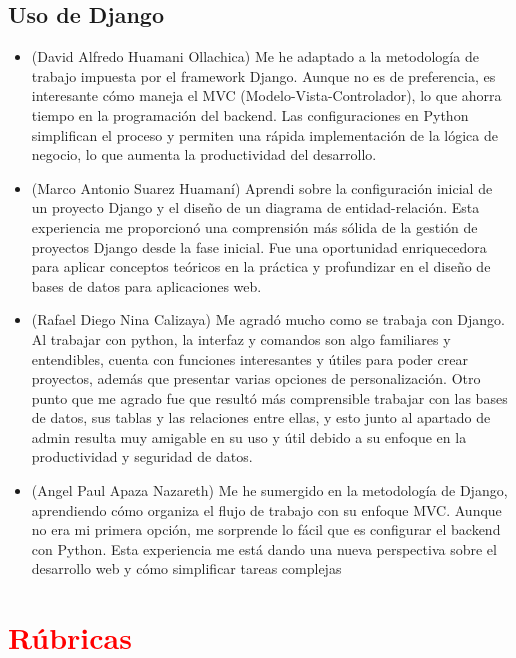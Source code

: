 \documentclass{article}
\begin{document}
\subsection{Uso de Django}
\begin{itemize}
    \item (David Alfredo Huamani Ollachica) Me he adaptado a la metodología de trabajo impuesta por el framework Django. Aunque no es de preferencia, es interesante cómo maneja el MVC (Modelo-Vista-Controlador), lo que ahorra tiempo en la programación del backend. Las configuraciones en Python simplifican el proceso y permiten una rápida implementación de la lógica de negocio, lo que aumenta la productividad del desarrollo.
    \item (Marco Antonio Suarez Huamaní)  Aprendi sobre la configuración inicial de un proyecto Django y el diseño de un diagrama de entidad-relación. Esta experiencia me proporcionó una comprensión más sólida de la gestión de proyectos Django desde la fase inicial. Fue una oportunidad enriquecedora para aplicar conceptos teóricos en la práctica y profundizar en el diseño de bases de datos para aplicaciones web.
    \item (Rafael Diego Nina Calizaya) Me agradó mucho como se trabaja con Django. Al trabajar con python, la interfaz y comandos son algo familiares y entendibles, cuenta con funciones interesantes y útiles para poder crear proyectos, además que presentar varias opciones de personalización. Otro punto que me agrado fue que resultó más comprensible trabajar con las bases de datos, sus tablas y las relaciones entre ellas, y esto junto al apartado de admin resulta muy amigable en su uso y útil debido a su enfoque en la productividad y seguridad de datos.
    \item (Angel Paul Apaza Nazareth) Me he sumergido en la metodología de Django, aprendiendo cómo organiza el flujo de trabajo con su enfoque MVC. Aunque no era mi primera opción, me sorprende lo fácil que es configurar el backend con Python. Esta experiencia me está dando una nueva perspectiva sobre el desarrollo web y cómo simplificar tareas complejas
\end{itemize}

	\section{\textcolor{red}{Rúbricas}}
	
\end{document}
